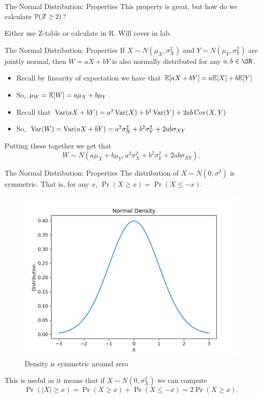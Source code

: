 \documentclass[notheorems,9pt]{beamer}
\begin{document}
\begin{frame}{The Normal Distribution: Properties} 
	\label{frame:nd-properties2}
	 This property is great, but how do we calculate \(\P(Z\geq 2)\)?	

	 Either use Z-table or calculate in R. Will cover in lab. 
\end{frame}
\begin{frame}{The Normal Distribution: Properties} 
	\label{frame:nd-properties3}
	 If \(X\sim N(\mu_X,\sigma_X^2)\) and \(Y\sim N(\mu_Y,\sigma_Y^2)\) are jointly normal, then \(W=aX+bY\) is also normally distributed for any \(a,b\in\SR\).

	\begin{itemize}
		\item Recall by linearity of expectation we have that \(\E[aX+bY] = a\E[X]+ b\E[Y]\)
		\item So, \(\mu_W = \E[W] = a\mu_X + b\mu_Y\).
	\end{itemize}
	\begin{itemize}
		\item Recall that \(\Var(aX+bY) = a^2\Var(X) + b^2\Var(Y) + 2ab\Cov(X,Y)\)
		\item So, \(\Var(W) = \Var(aX+bY) = a^2\sigma_X^2 + b^2\sigma_Y^2 + 2ab\sigma_{XY}\)
	\end{itemize}
	Putting these together we get that
	\[
		W\sim N\left(a\mu_X + b\mu_Y, a^2\sigma_X^2 + b^2\sigma_Y^2 + 2ab\sigma_{XY}\right)
	.\] 
\end{frame}
\begin{frame}{The Normal Distribution: Properties} 
	\label{frame:symmetry}
	 The distribution of \(X \sim N(0,\sigma^2)\) is symmetric. That is, for any \(x\), \(\Pr(X \geq x) = \Pr(X \leq -x)\).
	\begin{figure}[htpb]
		\centering
		\includegraphics[width=0.50\linewidth]{normal-density-standard.png}
		\caption{Density is symmetric around zero}%
	\end{figure}
	This is useful as it means that if \(X \sim N(0,\sigma_X^2)\) we can compute
	 \[
		 \Pr(|X|\geq x) = \Pr(X\geq x) + \Pr(X \leq -x) = 2\Pr(X\geq x)
	.\] 
\end{frame}
\end{document}
